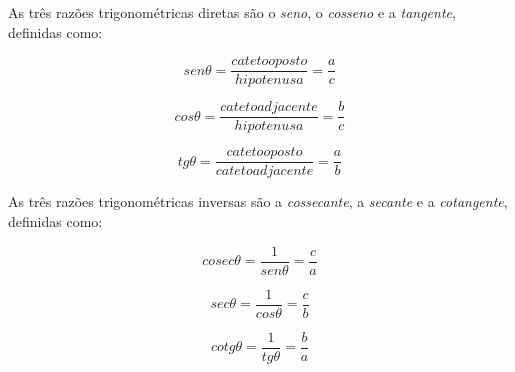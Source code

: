 \begin{caixa}
\begin{tdefinicao}
As três razões trigonométricas diretas são o \textit{seno}, o \textit{cosseno} e a \textit{tangente}, definidas como:

 \[ sen  \theta =\frac{cateto oposto}{hipotenusa}=\frac{a}{c} \]

 \[ cos \theta =\frac{cateto adjacente}{hipotenusa}=\frac{b}{c} \]

 \[ tg  \theta =\frac{cateto oposto}{cateto adjacente}=\frac{a}{b} \]

 As três razões trigonométricas inversas são a \textit{cossecante}, a \textit{secante} e a \textit{cotangente}, definidas como:

 \[ cosec  \theta =\frac{1}{sen \theta }=\frac{c}{a} \]

 \[ sec  \theta =\frac{1}{cos \theta }=\frac{c}{b} \]

 \[ cotg  \theta =\frac{1}{tg  \theta }=\frac{b}{a} \]
\end{tdefinicao}
\end{caixa}

